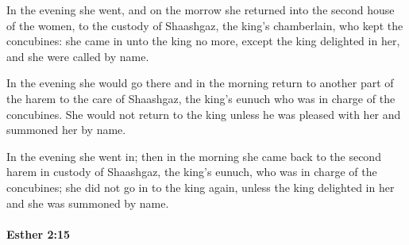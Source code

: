 			\begin{versebox}
					\item[BHS] 
					\item[LXX] 
					\item[ASV] In the evening she went, and on the morrow she returned into the second house of the women, to the custody of Shaashgaz, the king's chamberlain, who kept the concubines: she came in unto the king no more, except the king delighted in her, and she were called by name.
					\item[NIV] In the evening she would go there and in the morning return to another part of the harem to the care of Shaashgaz, the king’s eunuch who was in charge of the concubines. She would not return to the king unless he was pleased with her and summoned her by name.
					\item[NRSV] In the evening she went in; then in the morning she came back to the second harem in custody of Shaashgaz, the king’s eunuch, who was in charge of the concubines; she did not go in to the king again, unless the king delighted in her and she was summoned by name.
			\end{versebox}

		\paragraph{Esther 2:15} %
			\label{ESTHER-2-15}

